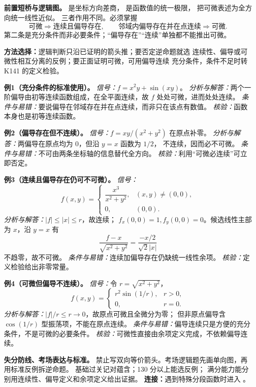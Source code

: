 
\begin{knowledgeBox}
\textbf{前置短桥与逻辑图。}
是坐标方向差商，
是函数值的统一极限，
把可微表述为全方向统一线性近似。
三者作用不同。必须掌握
\[
\text{{可微}}\Rightarrow\text{{连续且偏导存在}},
\qquad
\text{{邻域内偏导存在并在点连续}}\Rightarrow\text{{可微}}.
\]
第二条是充分条件而非必要条件；“偏导存在”“连续”单独都不能推出可微。

\textbf{方法选择：}逻辑判断只沿已证明的箭头推；要否定逆命题就选
连续性、偏导或可微性相互分离的反例；要正面证明可微，可用偏导连续
充分条件，条件不足时转 K141 的定义检验。

\textbf{例1（充分条件的标准使用）。}
\emph{信号：}\(f=x^2y+\sin(xy)\)。
\emph{分析与解答：}两个一阶偏导由初等连续函数组成，在全平面连续，故 \(f\)
处处可微，进而处处连续。
\emph{条件与易错：}要说偏导在邻域存在并在点连续，而非只在该点有数值。
\emph{核验：}函数本身也是初等连续函数。

\textbf{例2（偏导存在但不连续）。}
\emph{信号：}\(f=xy/(x^2+y^2)\) 在原点补零。
\emph{分析与解答：}两偏导在原点均为 \(0\)，但沿 \(y=x\) 函数为 \(1/2\)，
不连续，因而必不可微。
\emph{条件与易错：}不可由两条坐标轴的信息替代全方向。
\emph{核验：}利用“可微必连续”可立即否定。

\textbf{例3（连续且偏导存在仍可不可微）。}
\emph{信号：}
\[
f(x,y)=
\begin{cases}\dfrac{x^3}{x^2+y^2},&(x,y)\ne(0,0),\\0,&(0,0).\end{cases}
\]
\emph{分析与解答：}\(|f|\le|x|\le r\)，故连续；
\(f_x(0,0)=1,f_y(0,0)=0\)。候选线性主部为 \(x\)，沿 \(y=x\) 有
\[
\frac{f-x}{\sqrt{x^2+y^2}}
=\frac{-x/2}{\sqrt2|x|}
\]
不趋零，故不可微。
\emph{条件与易错：}连续加偏导存在仍缺统一线性余项。
\emph{核验：}定义检验给出非零常量。

\textbf{例4（可微但偏导不连续）。}
\emph{信号：}令 \(r=\sqrt{x^2+y^2}\)，
\[
f(x,y)=
\begin{cases}r^2\sin(1/r),&r>0,\\0,&r=0.\end{cases}
\]
\emph{分析与解答：}\(|f|/r\le r\to0\)，故原点可微且全微分为零；
但非原点偏导含 \(\cos(1/r)\) 型振荡项，不能在原点连续。
\emph{条件与易错：}偏导连续只是方便的充分条件，不是可微的必要条件。
\emph{核验：}可微性直接由余项定义完成，不依赖偏导连续。

\textbf{失分防线、考场表达与标准。}
禁止写双向等价箭头。考场逻辑题先画单向图，再用标准反例拆逆命题。
基础过关记对蕴含；130 分以上能选反例；
满分能力能分别用连续性、偏导定义和余项定义给出证据。
\textbf{连接：}遇到特殊分段函数时进入
。
\end{knowledgeBox}

